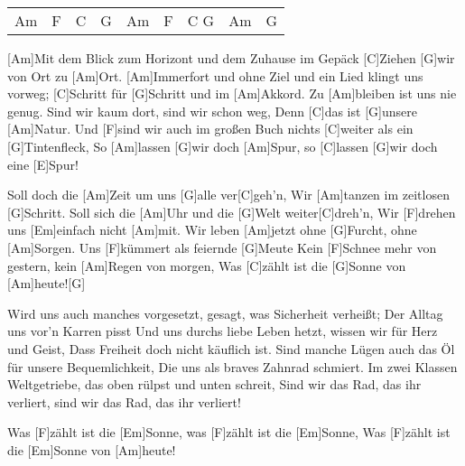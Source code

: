 



\begin{guitar}
	{\footnotesize\begin{tabular}{l|l|l|l|l|l|l|l|l}
			Am & F & C & G & Am & F & C G & Am & G 
	\end{tabular}}
	
	[Am]Mit dem Blick zum Horizont und dem Zuhause im Gepäck
	[C]Ziehen [G]wir von Ort zu [Am]Ort.
	[Am]Immerfort und ohne Ziel und ein Lied klingt uns vorweg;
	[C]Schritt für [G]Schritt und im [Am]Akkord.
	Zu [Am]bleiben ist uns nie genug. Sind wir kaum dort, sind wir schon weg,
	Denn [C]das ist [G]unsere [Am]Natur.
	Und [F]sind wir auch im großen Buch nichts [C]weiter als ein [G]Tintenfleck,
	So [Am]lassen [G]wir doch [Am]Spur, so [C]lassen [G]wir doch eine [E]Spur!
	
	Soll doch die [Am]Zeit um uns [G]alle ver[C]geh'n,
	Wir [Am]tanzen im zeitlosen [G]Schritt.
	Soll sich die [Am]Uhr und die [G]Welt weiter[C]dreh'n, 
	Wir [F]drehen uns [Em]einfach nicht [Am]mit.
	Wir leben [Am]jetzt ohne [G]Furcht, ohne [Am]Sorgen.
	Uns [F]kümmert als feiernde [G]Meute
	Kein [F]Schnee mehr von gestern, kein [Am]Regen von morgen,
	Was [C]zählt ist die [G]Sonne von [Am]heute![G]{}
	
	
	\pagebreak
	
	Wird uns auch manches vorgesetzt, gesagt, was Sicherheit verheißt;
	Der Alltag uns vor'n Karren pisst
	Und uns durchs liebe Leben hetzt, wissen wir für Herz und Geist,
	Dass Freiheit doch nicht käuflich ist.
	Sind manche Lügen auch das Öl für unsere Bequemlichkeit,
	Die uns als braves Zahnrad schmiert.
	Im zwei Klassen Weltgetriebe, das oben rülpst und unten schreit,
	Sind wir das Rad, das ihr verliert, sind wir das Rad, das ihr verliert!
	
	Was [F]zählt ist die [Em]Sonne, was [F]zählt ist die [Em]Sonne, 
	Was [F]zählt ist die [Em]Sonne von [Am]heute!
	

\end{guitar}
